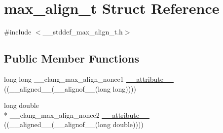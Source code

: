 \hypertarget{structmax__align__t}{\section{max\-\_\-align\-\_\-t Struct Reference}
\label{structmax__align__t}
}


{\ttfamily \#include $<$\-\_\-\-\_\-stddef\-\_\-max\-\_\-align\-\_\-t.\-h$>$}

\subsection*{Public Member Functions}
\begin{DoxyCompactItemize}
\item 
long long \-\_\-\-\_\-clang\-\_\-max\-\_\-align\-\_\-nonce1 \hyperlink{structmax__align__t_a4962b3f5174cd6d1d26f0e7c27b29c0d}{\-\_\-\-\_\-attribute\-\_\-\-\_\-} ((\-\_\-\-\_\-aligned\-\_\-\-\_\-(\-\_\-\-\_\-alignof\-\_\-\-\_\-(long long))))
\item 
long double \\*
\-\_\-\-\_\-clang\-\_\-max\-\_\-align\-\_\-nonce2 \hyperlink{structmax__align__t_af671ad5ae88de294ebf76b8803677991}{\-\_\-\-\_\-attribute\-\_\-\-\_\-} ((\-\_\-\-\_\-aligned\-\_\-\-\_\-(\-\_\-\-\_\-alignof\-\_\-\-\_\-(long double))))
\end{DoxyCompactItemize}


